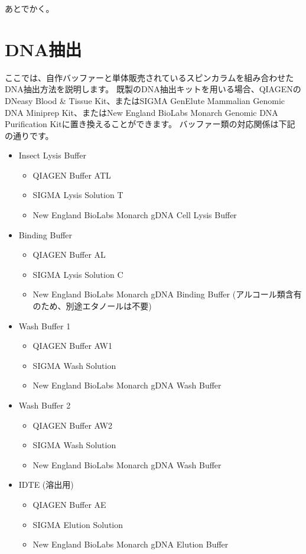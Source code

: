 \documentclass[titlepage,10pt,a4paper,uplatex]{jsbook}
\begin{document}
あとでかく。

\section{DNA抽出}

ここでは、自作バッファーと単体販売されているスピンカラムを組み合わせたDNA抽出方法を説明します。
既製のDNA抽出キットを用いる場合、QIAGENのDNeasy Blood \& Tissue Kit、またはSIGMA GenElute Mammalian Genomic DNA Miniprep Kit、またはNew England BioLabs Monarch Genomic DNA Purification Kitに置き換えることができます。
バッファー類の対応関係は下記の通りです。

\begin{itemize}
\item Insect Lysis Buffer
\begin{itemize}
\item QIAGEN Buffer ATL
\item SIGMA Lysis Solution T
\item New England BioLabs Monarch gDNA Cell Lysis Buffer
\end{itemize}
\item Binding Buffer
\begin{itemize}
\item QIAGEN Buffer AL
\item SIGMA Lysis Solution C
\item New England BioLabs Monarch gDNA Binding Buffer (アルコール類含有のため、別途エタノールは不要)
\end{itemize}
\item Wash Buffer 1
\begin{itemize}
\item QIAGEN Buffer AW1
\item SIGMA Wash Solution
\item New England BioLabs Monarch gDNA Wash Buffer
\end{itemize}
\item Wash Buffer 2
\begin{itemize}
\item QIAGEN Buffer AW2
\item SIGMA Wash Solution
\item New England BioLabs Monarch gDNA Wash Buffer
\end{itemize}
\item IDTE (溶出用)
\begin{itemize}
\item QIAGEN Buffer AE
\item SIGMA Elution Solution
\item New England BioLabs Monarch gDNA Elution Buffer
\end{itemize}
\end{itemize}
\end{document}
